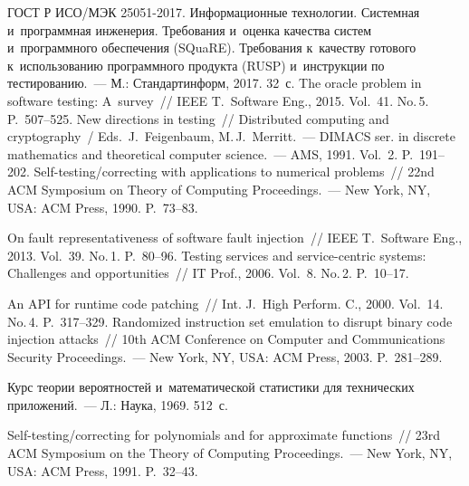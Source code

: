 \begin{multicols}{2}
{{\begin{thebibliography}{99}
     ГОСТ Р ИСО/МЭК 25051-2017. Информационные технологии. Системная 
и~программная инженерия. Требования и~оценка качества систем и~программно\-го 
обеспечения (SQuaRE). Требования к~качеству готового к~использованию программного 
продукта (RUSP) и~инструкции по тестированию.~--- М.: Стандартинформ, 2017. 32~с.
      The oracle problem in 
software testing: A~survey~// IEEE T.~Software Eng., 2015. Vol.~41. No.\,5.  
P.~507--525.
      New directions in testing~// 
      Distributed computing and cryptography~/
      Eds.\ J.~Feigenbaum, M.\,J.~Merritt.~---
      DIMACS ser. in discrete mathematics and 
theoretical computer science.~--- AMS, 1991. 
  Vol.~2. P.~191--202.
      Self-testing/correcting with applications to 
numerical problems~// 22nd ACM Symposium on Theory of Computing Proceedings.~--- New 
York, NY, USA: ACM Press, 1990. P.~73--83.
     
      On fault representativeness of 
software fault injection~// IEEE T.~Software Eng., 2013. Vol.~39. No.\,1. P.~80--96.
      Testing services and service-centric systems: Challenges 
and opportunities~// IT Prof., 2006. Vol.~8. No.\,2. P.~10--17.

      An API for runtime code patching~// Int. 
J.~High Perform. C., 2000. Vol.~14. No.\,4. P.~317--329.
      Randomized instruction set emulation to disrupt binary code injection attacks~// 
10th ACM Conference on Computer and Communications Security Proceedings.~--- New York, 
NY, USA: ACM Press, 2003. P.~281--289.

      Курс теории вероятностей 
и~математической статистики для технических приложений.~--- Л.: Наука, 1969. 512~с.
     
Self-testing/correcting for polynomials and for approximate functions~// 23rd ACM Symposium 
on the Theory of Computing Proceedings.~--- New York, NY, USA: ACM Press, 1991.  
P.~32--43.


\end{thebibliography}}}
\end{multicols}
